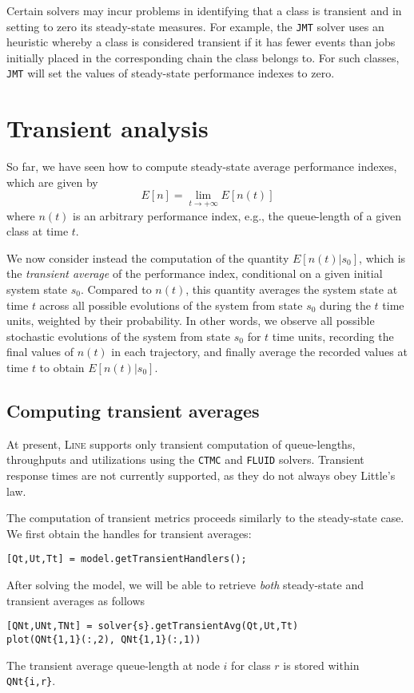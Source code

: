 Certain solvers may incur problems in identifying that a class is transient and in setting to zero its steady-state measures. For example, the \texttt{JMT} solver uses an heuristic whereby a class is considered transient if it has fewer events than jobs initially placed in the corresponding chain the class belongs to. For such classes, \texttt{JMT} will set the values of steady-state performance indexes to zero.


\section{Transient analysis}
So far, we have seen how to compute steady-state average performance indexes, which are given by
\[
E[n]=\lim\limits_{t\to +\infty }E[n(t)]
\]
where $n(t)$ is an arbitrary performance index, e.g., the queue-length of a given class at time $t$.

We now consider instead the computation of the quantity $E[n(t)|s_0]$, which is the {\em transient average} of the performance index, conditional on a given initial system state $s_0$. Compared to $n(t)$, this quantity averages the system state at time $t$ across all possible evolutions of the system from state $s_0$ during the $t$ time units, weighted by their probability. In other words, we observe all possible stochastic evolutions of the system from state $s_0$ for $t$ time units, recording the final values of $n(t)$ in each trajectory, and finally average the recorded values at time $t$ to obtain $E[n(t)|s_0]$.

\subsection{Computing transient averages}
At present, \textsc{Line} supports only transient computation of queue-lengths, throughputs and utilizations using the \texttt{CTMC} and \texttt{FLUID} solvers. Transient response times are not currently supported, as they do not always obey Little's law.

The computation of transient metrics proceeds similarly to the steady-state case. We first obtain the handles for transient averages:
\begin{lstlisting}
[Qt,Ut,Tt] = model.getTransientHandlers();
\end{lstlisting}
After solving the model, we will be able to retrieve {\em both} steady-state and transient averages as follows
\begin{lstlisting}
[QNt,UNt,TNt] = solver{s}.getTransientAvg(Qt,Ut,Tt)
plot(QNt{1,1}(:,2), QNt{1,1}(:,1))
\end{lstlisting}
The transient average queue-length at node $i$ for class $r$ is stored within \texttt{QNt\{i,r\}}.%

